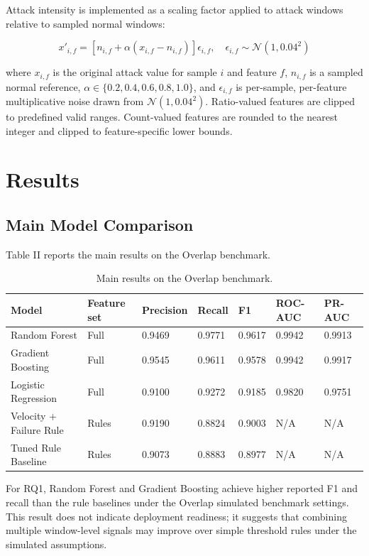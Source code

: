 \documentclass[conference]{IEEEtran}
\begin{document}
Attack intensity is implemented as a scaling factor applied to attack windows relative to sampled normal windows:

\begin{equation}
x'_{i,f}=\left[n_{i,f}+\alpha\left(x_{i,f}-n_{i,f}\right)\right]\epsilon_{i,f},\quad \epsilon_{i,f}\sim\mathcal{N}(1,0.04^2)
\end{equation}

where \(x_{i,f}\) is the original attack value for sample \(i\) and feature \(f\), \(n_{i,f}\) is a sampled normal reference, \(\alpha \in \{0.2,0.4,0.6,0.8,1.0\}\), and \(\epsilon_{i,f}\) is per-sample, per-feature multiplicative noise drawn from \(\mathcal{N}(1,0.04^2)\). Ratio-valued features are clipped to predefined valid ranges. Count-valued features are rounded to the nearest integer and clipped to feature-specific lower bounds.

\section{Results}

\subsection{Main Model Comparison}

Table II reports the main results on the Overlap benchmark.

\begin{table}[!t]
\centering
\caption{Main results on the Overlap benchmark.}
\tiny
\begin{tabular}{lllllll}
\toprule
\textbf{Model} & \textbf{Feature set} & \textbf{Precision} & \textbf{Recall} & \textbf{F1} & \textbf{ROC-AUC} & \textbf{PR-AUC} \\
\midrule
Random Forest & Full & 0.9469 & 0.9771 & 0.9617 & 0.9942 & 0.9913 \\
Gradient Boosting & Full & 0.9545 & 0.9611 & 0.9578 & 0.9942 & 0.9917 \\
Logistic Regression & Full & 0.9100 & 0.9272 & 0.9185 & 0.9820 & 0.9751 \\
Velocity + Failure Rule & Rules & 0.9190 & 0.8824 & 0.9003 & N/A & N/A \\
Tuned Rule Baseline & Rules & 0.9073 & 0.8883 & 0.8977 & N/A & N/A \\
\bottomrule
\end{tabular}
\end{table}

For RQ1, Random Forest and Gradient Boosting achieve higher reported F1 and recall than the rule baselines under the Overlap simulated benchmark settings. This result does not indicate deployment readiness; it suggests that combining multiple window-level signals may improve over simple threshold rules under the simulated assumptions.
\end{document}
